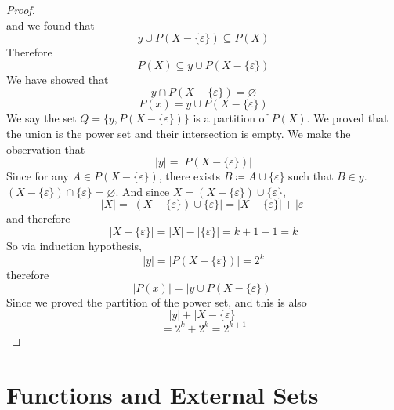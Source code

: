 \documentclass[12pt]{book}
\newcommand{\paren}[1]{\left( #1 \right)}
\newcommand{\abso}[1]{\left|#1 \right|}
\begin{document}
\begin{proof}
\[        \]
        and we found that
        \[
        y \cup P\paren{X - \{\varepsilon\}} \subseteq P(X)
        \]
        Therefore
        \[
        P(X) \subseteq y \cup P\paren{X - \{\varepsilon\}}
        \]
        We have showed that
        \[
        y \cap P(X - \{\varepsilon\}) = \varnothing
        \]
        \[
        P(x) = y \cup P(X - \{\varepsilon\})
        \]
        We say the set $Q = \{ y, P(X - \{\varepsilon\})\}$ is a partition of $P(X)$. We proved that the union is the power set and their intersection is empty. We make the observation that 
        \[
        \abso{y} = \abso{P(X - \{\varepsilon\})}
        \]
        Since for any $A \in P(X - \{\varepsilon\})$, there exists $B \coloneqq A \cup \{ \varepsilon \}$ such that $B \in y$. $(X - \{\varepsilon\}) \cap \{\varepsilon\} = \varnothing$. And since $X = (X - \{\varepsilon\}) \cup \{ \varepsilon \}$, 
        \[
       \abso{X}= \abso{(X - \{\varepsilon\}) \cup \{ \varepsilon \}} = \abso{X - \{\varepsilon\}} + \abso{ \varepsilon}
        \]
        and therefore
        \[
        \abso{X - \{\varepsilon\}} = \abso{X} - \abso{\{ \varepsilon\}} = k+1-1 = k
        \]
        So via induction hypothesis, 
        \[
        \abso{y} = \abso{P(X - \{\varepsilon\})}= 2^k
        \]
        therefore
        \[
        \abso{P(x)} = \abso{y \cup P(X - \{\varepsilon\})}
        \]
        Since we proved the partition of the power set, and this is also
        \[
        \abso{y} + \abso{X - \{\varepsilon\}}
        \]
        \[
         = 2^k + 2^k = 2^{k+1}
        \]

        
        
        
    \end{proof}

\newpage
    
    
\section{Functions and External Sets}
\end{document}
